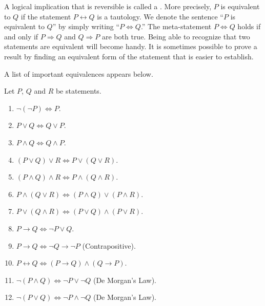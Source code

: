 A logical implication that is reversible is called a .
More precisely, $P$ is equivalent to $Q$ if the statement $P \leftrightarrow Q$ is a tautology.
We denote the sentence ``$P$ is equivalent to $Q$'' by simply writing ``$P \Leftrightarrow Q$.''
The meta-statement $P \Leftrightarrow Q$ holds if and only if $P \Rightarrow Q$ and $Q \Rightarrow P$ are both true.
Being able to recognize that two statements are equivalent will become handy.
It is sometimes possible to prove a result by finding an equivalent form of the statement that is easier to establish.

A list of important equivalences appears below.

\begin{fact}
Let $P$, $Q$ and $R$ be statements.
\begin{enumerate}
\item $\neg (\neg P) \Leftrightarrow P$.
\item $P \vee Q \Leftrightarrow Q \vee P$.
\item $P \wedge Q \Leftrightarrow Q \wedge P$.
\item $(P \vee Q) \vee R \Leftrightarrow P \vee (Q \vee R)$.
\item $(P \wedge Q) \wedge R \Leftrightarrow P \wedge (Q \wedge R)$.
\item $P \wedge (Q \vee R) \Leftrightarrow (P \wedge Q) \vee (P \wedge R)$.
\item $P \vee (Q \wedge R) \Leftrightarrow (P \vee Q) \wedge (P \vee R)$.
\item $P \rightarrow Q \Leftrightarrow \neg P \vee Q$.
\item $P \rightarrow Q \Leftrightarrow \neg Q \rightarrow \neg P$ (Contrapositive).
\item $P \leftrightarrow Q \Leftrightarrow (P \rightarrow Q) \wedge (Q \rightarrow P)$.
\item $\neg (P \wedge Q) \Leftrightarrow \neg P \vee \neg Q$ (De Morgan's Law).
\item $\neg (P \vee Q) \Leftrightarrow \neg P \wedge \neg Q$ (De Morgan's Law).
\end{enumerate}
\end{fact}


